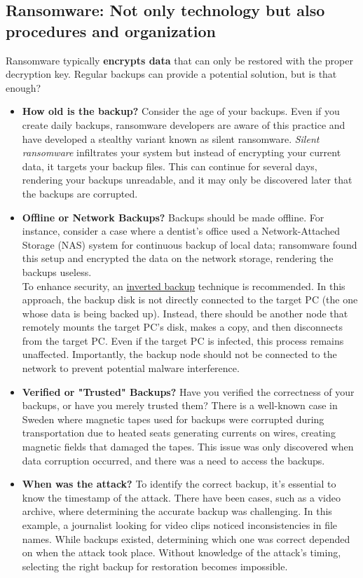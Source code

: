 \subsection*{Ransomware: Not only technology but also procedures and organization}
Ransomware typically \textbf{encrypts data} that can only be restored with the proper decryption key. Regular backups can provide a potential solution, but is that enough?
\begin{itemize}
  \item \textbf{How old is the backup?} Consider the age of your backups. Even if you create daily backups, ransomware developers are aware of this practice and have developed a stealthy variant known as silent ransomware. \emph{Silent ransomware} infiltrates your system but instead of encrypting your current data, it targets your backup files. This can continue for several days, rendering your backups unreadable, and it may only be discovered later that the backups are corrupted.
  \item \textbf{Offline or Network Backups?} Backups should be made offline. For instance, consider a case where a dentist's office used a Network-Attached Storage (NAS) system for continuous backup of local data; ransomware found this setup and encrypted the data on the network storage, rendering the backups useless.\\
        To enhance security, an \ul{inverted backup} technique is recommended. In this approach, the backup disk is not directly connected to the target PC (the one whose data is being backed up). Instead, there should be another node that remotely mounts the target PC's disk, makes a copy, and then disconnects from the target PC. Even if the target PC is infected, this process remains unaffected. Importantly, the backup node should not be connected to the network to prevent potential malware interference.
  \item \textbf{Verified or "Trusted" Backups?} Have you verified the correctness of your backups, or have you merely trusted them? There is a well-known case in Sweden where magnetic tapes used for backups were corrupted during transportation due to heated seats generating currents on wires, creating magnetic fields that damaged the tapes. This issue was only discovered when data corruption occurred, and there was a need to access the backups.
  \item \textbf{When was the attack?} To identify the correct backup, it's essential to know the timestamp of the attack. There have been cases, such as a video archive, where determining the accurate backup was challenging. In this example, a journalist looking for video clips noticed inconsistencies in file names. While backups existed, determining which one was correct depended on when the attack took place. Without knowledge of the attack's timing, selecting the right backup for restoration becomes impossible.
\end{itemize}



